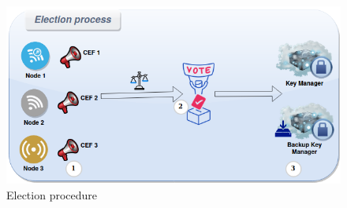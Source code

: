 \begin{figure}[htbp]
	\centerline{\includegraphics[scale=0.50]{figures/election.png}}
	\caption{Election procedure}
	\label{fig:election_proc}
\end{figure}


